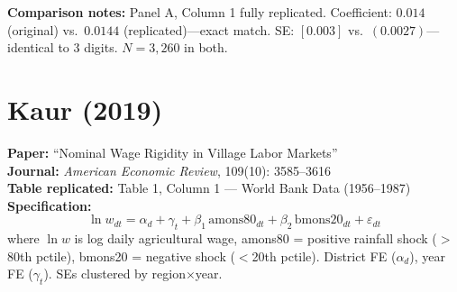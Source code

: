 \documentclass[11pt,a4paper]{article}
\begin{document}
\vspace{1cm}
\textbf{Comparison notes:} Panel A, Column 1 fully replicated. Coefficient: $0.014$ (original) vs.\ $0.0144$ (replicated)---exact match. SE: $[0.003]$ vs.\ $(0.0027)$---identical to 3 digits. $N = 3{,}260$ in both.

\newpage

\section{Kaur (2019)}

\textbf{Paper:} ``Nominal Wage Rigidity in Village Labor Markets''\\
\textbf{Journal:} \textit{American Economic Review}, 109(10): 3585--3616\\
\textbf{Table replicated:} Table 1, Column 1 --- World Bank Data (1956--1987)\\
\textbf{Specification:}
\[
\ln w_{dt} = \alpha_d + \gamma_t + \beta_1\,\text{amons80}_{dt} + \beta_2\,\text{bmons20}_{dt} + \varepsilon_{dt}
\]
where $\ln w$ is log daily agricultural wage, amons80 = positive rainfall shock ($>$80th pctile), bmons20 = negative shock ($<$20th pctile). District FE ($\alpha_d$), year FE ($\gamma_t$). SEs clustered by region$\times$year.

\vspace{0.3cm}
\noindent{}
\end{document}
